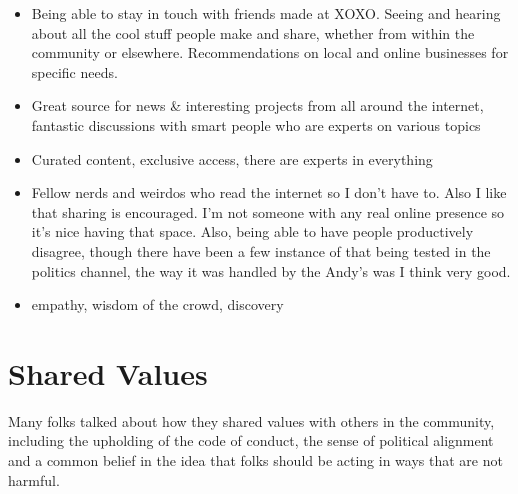 \documentclass[
]{book}
\providecommand{\tightlist}{%
  \setlength{\itemsep}{0pt}\setlength{\parskip}{0pt}}
\begin{document}
\begin{itemize}
\tightlist
\item
  Being able to stay in touch with friends made at XOXO. Seeing and hearing about all the cool stuff people make and share, whether from within the community or elsewhere. Recommendations on local and online businesses for specific needs.
\item
  Great source for news \& interesting projects from all around the internet, fantastic discussions with smart people who are experts on various topics
\item
  Curated content, exclusive access, there are experts in everything
\item
  Fellow nerds and weirdos who read the internet so I don't have to. Also I like that sharing is encouraged. I'm not someone with any real online presence so it's nice having that space. Also, being able to have people productively disagree, though there have been a few instance of that being tested in the politics channel, the way it was handled by the Andy's was I think very good.
\item
  empathy, wisdom of the crowd, discovery
\end{itemize}

\section{Shared Values}\label{shared-values}

Many folks talked about how they shared values with others in the community, including the upholding of the code of conduct, the sense of political alignment and a common belief in the idea that folks should be acting in ways that are not harmful.
\end{document}

